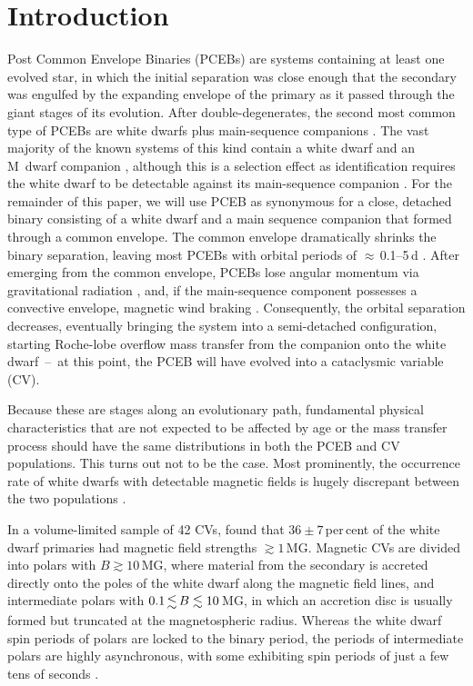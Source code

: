 \documentclass[fleqn,usenatbib]{mnras}
\begin{document}
\section{Introduction}
Post Common Envelope Binaries (PCEBs) are systems containing at least one evolved star, in which the initial separation was close enough that the secondary was engulfed by the expanding envelope of the primary as it passed through the giant stages of its evolution. After double-degenerates, the second most common type of PCEBs are white dwarfs plus main-sequence companions \citep{toonenetal17-1}. The vast majority of the known systems of this kind contain a white dwarf and an M~dwarf companion \citep{rebassa-mansergasetal10-1}, although this is a selection effect as identification requires the white dwarf to be detectable against its main-sequence companion \citep{inightetal21-1}. For the remainder of this paper, we will use PCEB as synonymous for a close, detached binary consisting of a white dwarf and a main sequence companion that formed through a common envelope. The common envelope dramatically shrinks the binary separation, leaving most PCEBs with orbital periods of $\approx$\,0.1--5\,d \citep{nebotetal11-1}. After emerging from the common envelope, PCEBs lose angular momentum via gravitational radiation \citep{paczynski+sienkiewicz81-1}, and, if the main-sequence component possesses a convective envelope, magnetic wind braking \citep{rappaportetal83-1}. Consequently, the orbital separation decreases, eventually bringing the system into a semi-detached configuration, starting Roche-lobe overflow mass transfer from the companion onto the white dwarf~--~at this point, the PCEB will have evolved into a cataclysmic variable (CV). 

Because these are stages along an evolutionary path, fundamental physical characteristics that are not expected to be affected by age or the mass transfer process should have the same distributions in both the PCEB and CV populations. This turns out not to be the case. Most prominently, the occurrence rate of white dwarfs with detectable magnetic fields is hugely discrepant between the two populations \citep{liebertetal05-2}. 

In a volume-limited sample of 42 CVs, \citet{palaetal20-1} found that $36\pm7$\,per\,cent of the white dwarf primaries had magnetic field strengths $\gtrsim 1$\,MG. Magnetic CVs are divided into polars with $B \gtrsim 10$\,MG, where material from the secondary is accreted directly onto the poles of the white dwarf along the magnetic field lines, and intermediate polars with  $0.1 \la B \lesssim 10$\,MG, in which an accretion disc is usually formed but truncated at the magnetospheric radius. Whereas the white dwarf spin periods of polars are locked to the binary period, the periods of intermediate polars are highly asynchronous, with some exhibiting spin periods of just a few tens of seconds \citep{patterson79-1,lopesdeoliveiraetal20-1}.     
\end{document}
